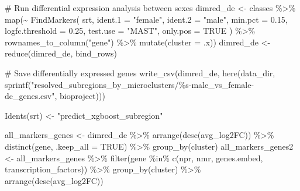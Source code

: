 \documentclass[
  letterpaper,
  DIV=11,
  numbers=noendperiod]{scrartcl}
\newenvironment{Shaded}{\begin{snugshade}}{\end{snugshade}}
\newcommand{\AttributeTok}[1]{\textcolor[rgb]{0.40,0.45,0.13}{#1}}
\newcommand{\CommentTok}[1]{\textcolor[rgb]{0.37,0.37,0.37}{#1}}
\newcommand{\ConstantTok}[1]{\textcolor[rgb]{0.56,0.35,0.01}{#1}}
\newcommand{\FloatTok}[1]{\textcolor[rgb]{0.68,0.00,0.00}{#1}}
\newcommand{\FunctionTok}[1]{\textcolor[rgb]{0.28,0.35,0.67}{#1}}
\newcommand{\NormalTok}[1]{\textcolor[rgb]{0.00,0.23,0.31}{#1}}
\newcommand{\OtherTok}[1]{\textcolor[rgb]{0.00,0.23,0.31}{#1}}
\newcommand{\SpecialCharTok}[1]{\textcolor[rgb]{0.37,0.37,0.37}{#1}}
\newcommand{\StringTok}[1]{\textcolor[rgb]{0.13,0.47,0.30}{#1}}
\begin{document}
\begin{Shaded}
\begin{Highlighting}[]
\CommentTok{\# Run differential expression analysis between sexes}
\NormalTok{dimred\_de }\OtherTok{\textless{}{-}}
\NormalTok{  classes }\SpecialCharTok{\%\textgreater{}\%}
  \FunctionTok{map}\NormalTok{(}\SpecialCharTok{\textasciitilde{}} \FunctionTok{FindMarkers}\NormalTok{(}
\NormalTok{    srt,}
    \AttributeTok{ident.1 =} \StringTok{"female"}\NormalTok{,}
    \AttributeTok{ident.2 =} \StringTok{"male"}\NormalTok{,}
    \AttributeTok{min.pct =} \FloatTok{0.15}\NormalTok{,}
    \AttributeTok{logfc.threshold =} \FloatTok{0.25}\NormalTok{,}
    \AttributeTok{test.use =} \StringTok{"MAST"}\NormalTok{,}
    \AttributeTok{only.pos =} \ConstantTok{TRUE}
\NormalTok{  ) }\SpecialCharTok{\%\textgreater{}\%}
    \FunctionTok{rownames\_to\_column}\NormalTok{(}\StringTok{"gene"}\NormalTok{) }\SpecialCharTok{\%\textgreater{}\%}
    \FunctionTok{mutate}\NormalTok{(}\AttributeTok{cluster =}\NormalTok{ .x))}
\NormalTok{dimred\_de }\OtherTok{\textless{}{-}} \FunctionTok{reduce}\NormalTok{(dimred\_de, bind\_rows)}

\CommentTok{\# Save differentially expressed genes}
\FunctionTok{write\_csv}\NormalTok{(dimred\_de, }\FunctionTok{here}\NormalTok{(data\_dir, }\FunctionTok{sprintf}\NormalTok{(}\StringTok{"resolved\_subregions\_by\_microclusters/\%s{-}male\_vs\_female{-}de\_genes.csv"}\NormalTok{, bioproject)))}

\FunctionTok{Idents}\NormalTok{(srt) }\OtherTok{\textless{}{-}} \StringTok{"predict\_xgboost\_subregion"}

\NormalTok{all\_markers\_genes }\OtherTok{\textless{}{-}}\NormalTok{ dimred\_de }\SpecialCharTok{\%\textgreater{}\%}
  \FunctionTok{arrange}\NormalTok{(}\FunctionTok{desc}\NormalTok{(avg\_log2FC)) }\SpecialCharTok{\%\textgreater{}\%}
  \FunctionTok{distinct}\NormalTok{(gene, }\AttributeTok{.keep\_all =} \ConstantTok{TRUE}\NormalTok{) }\SpecialCharTok{\%\textgreater{}\%}
  \FunctionTok{group\_by}\NormalTok{(cluster)}
\NormalTok{all\_markers\_genes2 }\OtherTok{\textless{}{-}}\NormalTok{ all\_markers\_genes }\SpecialCharTok{\%\textgreater{}\%}
  \FunctionTok{filter}\NormalTok{(gene }\SpecialCharTok{\%in\%} \FunctionTok{c}\NormalTok{(npr, nmr, genes.embed, transcription\_factors)) }\SpecialCharTok{\%\textgreater{}\%}
  \FunctionTok{group\_by}\NormalTok{(cluster) }\SpecialCharTok{\%\textgreater{}\%}
  \FunctionTok{arrange}\NormalTok{(}\FunctionTok{desc}\NormalTok{(avg\_log2FC))}


\end{Highlighting}
\end{Shaded}
\end{document}
